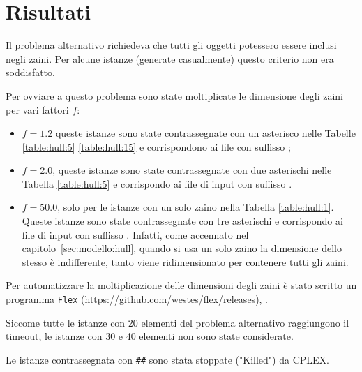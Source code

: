 \section{Risultati}
\label{sec:results}
Il problema alternativo richiedeva che tutti gli oggetti potessero
essere inclusi negli zaini. Per alcune istanze (generate casualmente) 
questo criterio non era soddisfatto.

Per ovviare a questo problema sono state moltiplicate le dimensione degli
zaini per vari fattori $f$:
\begin{itemize}
\item $f = 1.2$ queste istanze sono state contrassegnate con un asterisco nelle
Tabelle \ref{table:hull:5} \ref{table:hull:15} e corrispondono
ai file con suffisso ;
\item $f = 2.0$, queste istanze sono state contrassegnate con due asterischi
nelle Tabella \ref{table:hull:5} 
e corrispondo ai file di input con suffisso .
\item $f = 50.0$, solo per le istanze con un solo
zaino nella Tabella \ref{table:hull:1}. Queste istanze sono state contrassegnate
 con tre asterischi e corrispondo ai file di input con suffisso
. 
Infatti,
come accennato nel capitolo~\ref{sec:modello:hull}, quando si usa un solo zaino
la dimensione dello stesso è indifferente, tanto viene ridimensionato
per contenere tutti gli zaini.

\end{itemize}


Per automatizzare la moltiplicazione delle dimensioni degli zaini è stato 
scritto un programma \verb|Flex| (\url{https://github.com/westes/flex/releases}),
.

Siccome tutte le istanze con 20 elementi del problema alternativo raggiungono
il timeout, le istanze con 30 e 40 elementi non sono state considerate.

Le istanze contrassegnata con \texttt{\#\#} sono stata stoppate ("Killed") da CPLEX.



